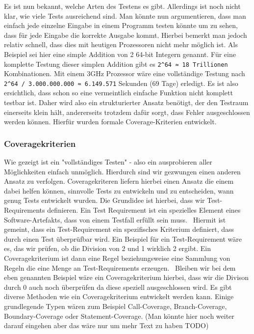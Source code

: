 Es ist nun bekannt, welche Arten des Testens es gibt.
Allerdings ist noch nicht klar, wie viele Tests ausreichend sind.
Man könnte nun argumentieren, dass man einfach jede einzelne Eingabe in einem Programm testen könnte um zu sehen,
dass für jede Eingabe die korrekte Ausgabe kommt.
Hierbei bemerkt man jedoch relativ schnell, dass dies mit heutigen Prozessoren nicht mehr möglich ist.
Als Beispiel sei hier eine simple Addition von 2 64-bit Integern genannt.
Für eine komplette Testung dieser simplen Addition gibt es \verb+2^64 ≈ 18 Trillionen+ Kombinationen.
Mit einem 3GHz Prozessor wäre eine vollständige Testung nach \verb+2^64 / 3.000.000.000 ≈ 6.149.571+ Sekunden (69 Tage) erledigt.
Es ist also ersichtlich, dass schon so eine vermeintlich einfache Funktion nicht komplett testbar ist.
Daher wird also ein strukturierter Ansatz benötigt, der den Testraum einerseits klein hält, andererseits trotzdem dafür sorgt, dass
Fehler ausgeschlossen werden können.
Hierfür wurden formale Coverage-Kriterien entwickelt.\cite[vgl. S.17]{software-testing}

\subsubsection{Coveragekriterien}

Wie gezeigt ist ein "vollständiges Testen" - also ein ausprobieren aller Möglichkeiten einfach unmöglich.
Hierdurch sind wir gezwungen einen anderen Ansatz zu verfolgen.
Coveragekriteren liefern hierbei einen Ansatz die einem dabei helfen können, sinnvolle Tests zu entwickeln und zu entscheiden,
wann genug Tests entwickelt wurden.
Die Grundidee ist hierbei, dass wir Test-Requirements definieren.
Ein Test Requirement ist ein spezielles Element eines Software-Artefakts, dass von einem Testfall erfüllt sein muss.~\cite[vgl. S.17]{software-testing}
Hiermit ist gemeint, dass ein Test-Requirement ein spezifisches Kriterium definiert, dass durch einen Test überprüfbar
wird.
Ein Beispiel für ein Test-Requirement wäre es, das wir prüfen, ob die Division von 2 und 1 wirklich 2 ergibt.
Ein Coveragekriterium ist dann eine Regel beziehungsweise eine Sammlung von Regeln die eine Menge an Test-Requirements erzeugen.~\cite[vgl. S.17]{software-testing}
Bleiben wir bei dem eben genannten Beispiel wäre ein Coveragekriterium hierbei, dass wir die Divison durch 0 auch noch überprüfen
da diese speziell ausgeschlossen wird.
Es gibt diverse Methoden wie ein Coveragekriterium entwickelt werden kann.
Einige grundlegende Typen wären zum Beispiel Call-Coverage, Branch-Coverage, Boundary-Coverage oder Statement-Coverage.
(Man könnte hier noch weiter darauf eingehen aber das wäre nur um mehr Text zu haben TODO)







